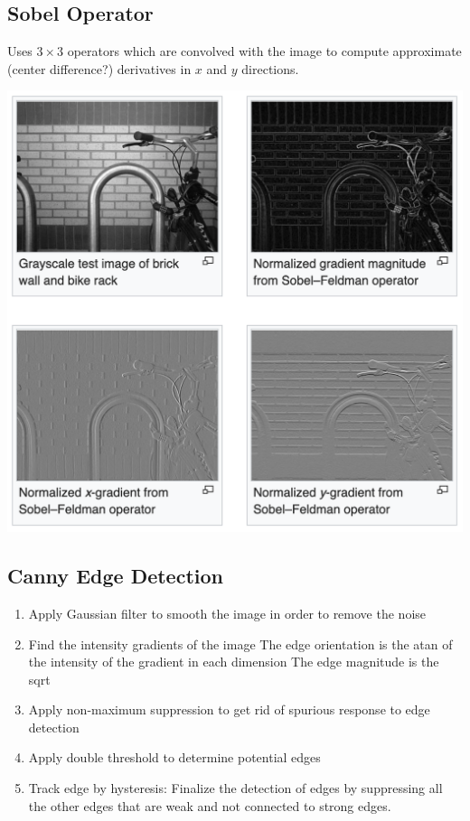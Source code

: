\subsection{Sobel Operator}

Uses $3\times3$ operators which are convolved with the image to compute approximate (center difference?) derivatives in $x$ and $y$ directions.

\includegraphics[width=0.9\columnwidth]{img_proc/sobel.png}

\subsection{Canny Edge Detection}
\begin{enumerate}
\item Apply Gaussian filter to smooth the image in order to remove the noise
\item Find the intensity gradients of the image
	The edge orientation is the atan of the intensity of the gradient in each dimension
	The edge magnitude is the sqrt
\item Apply non-maximum suppression to get rid of spurious response to edge detection
\item Apply double threshold to determine potential edges
\item Track edge by hysteresis: Finalize the detection of edges by suppressing all the other edges that are weak and not connected to strong edges.
\end{enumerate}

